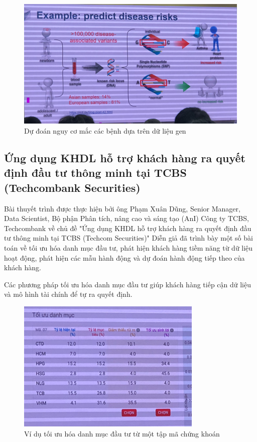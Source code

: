 \documentclass[14pt, a4paper]{article}
\numberwithin{equation}{section}
\numberwithin{figure}{section}
\numberwithin{dl}{section}
\numberwithin{md}{section}
\numberwithin{bd}{section}
\numberwithin{dn}{section}
\numberwithin{hq}{section}
\begin{document}
    \begin{figure}[h!]
        \centering
        \includegraphics[scale=0.8]{predict-disease-risk.png}
        \caption{Dự đoán nguy cơ mắc các bệnh dựa trên dữ liệu gen}
    \end{figure}

    \subsection{Ứng dụng KHDL hỗ trợ khách hàng ra quyết định đầu tư thông minh tại TCBS (Techcombank Securities)}

    Bài thuyết trình được thực hiện bởi ông Phạm Xuân Dũng, Senior Manager, Data Scientist, Bộ phận Phân tích, nâng cao và sáng tạo (AnI) Công ty TCBS, Techcombank về chủ đề "Ứng dụng KHDL hỗ trợ khách hàng ra quyết định đầu tư thông minh tại TCBS (Techcom Securities)"
    Diễn giả đã trình bày một số bài toán về tối ưu hóa danh mục đầu tư, phát hiện khách hàng tiềm năng từ dữ liệu hoạt động, phát hiện các mẫu hành động và dự đoán hành động tiếp theo của khách hàng.

    Các phương pháp tối ưu hóa danh mục đầu tư giúp khách hàng tiếp cận dữ liệu và mô hình tài chính để tự ra quyết định.

    \begin{figure}[h!]
        \centering
        \includegraphics{Portfolio_Optimization.png}
        \caption{Ví dụ tối ưu hóa danh mục đầu tư từ một tập mã chứng khoán}
    \end{figure}
\end{document}
